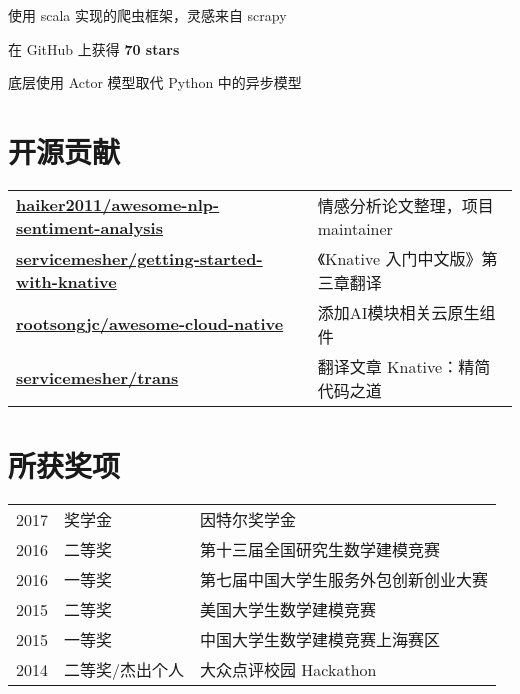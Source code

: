 \documentclass[]{deedy-resume-openfont}
\begin{document}
\begin{minipage}[t]{0.73\textwidth}
\begin{tightemize}
    \item 使用 scala 实现的爬虫框架，灵感来自 scrapy
    \item 在 GitHub 上获得 \textbf{70 stars}
    \item 底层使用 Actor 模型取代 Python 中的异步模型
    \end{tightemize}
\sectionsep


\section{开源贡献}
\begin{tabular}{ll}
\href{https://github.com/haiker2011/awesome-nlp-sentiment-analysis/commits?author=haiker2011}{\bf haiker2011/awesome-nlp-sentiment-analysis} & 情感分析论文整理，项目 maintainer \\
\href{https://github.com/servicemesher/getting-started-with-knative/commits?author=haiker2011}{\bf servicemesher/getting-started-with-knative} & 《Knative 入门中文版》第三章翻译 \\
\href{https://github.com/rootsongjc/awesome-cloud-native/commits?author=haiker2011}{\bf rootsongjc/awesome-cloud-native} & 添加AI模块相关云原生组件 \\
\href{https://github.com/servicemesher/trans/commits?author=haiker2011}{\bf servicemesher/trans} & 翻译文章 Knative：精简代码之道 \\
\end{tabular}
\sectionsep


\section{所获奖项} 
\begin{tabular}{rll}
2017         & 奖学金  & 因特尔奖学金 \\
2016	     & 二等奖  & 第十三届全国研究生数学建模竞赛 \\
2016	     & 一等奖  & 第七届中国大学生服务外包创新创业大赛 \\
2015	     & 二等奖  & 美国大学生数学建模竞赛 \\
2015         & 一等奖 & 中国大学生数学建模竞赛上海赛区 \\
2014	     & 二等奖/杰出个人  & 大众点评校园 Hackathon \\
\end{tabular}
\sectionsep


% 
% 

\end{minipage} 
\end{document}
